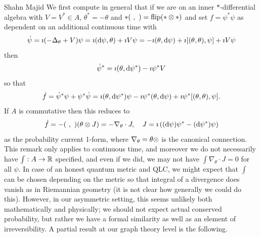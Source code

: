 \begin{artengenv}{Shahn Majid}
We first compute in general that if we are on an inner $*$-differential algebra with $V=V^*\in A$, $\theta^*=-\theta$ and $*(\ ,\ )={\rm flip}(*\otimes *)$ and set $f=\psi^*\psi$ as dependent on an additional continuous time with 
\[ \dot\psi=\imath(-\Delta_\theta+ V)\psi=\imath ({\rm d}\psi,\theta)+\imath V\psi=-\imath(\theta,{\rm d}\psi)+\imath[(\theta,\theta),\psi]+\imath V\psi\]
then
\[ \dot \psi^*=\imath(\theta,{\rm d} \psi^*)-\imath \psi^*V\]
so that 
\[ \dot f=\dot\psi^*\psi+\psi^*\dot\psi=\imath(\theta,{\rm d} \psi^*)\psi-\imath\psi^*(\theta,{\rm d}\psi)+\imath\psi^*[(\theta,\theta),\psi].\]
If $A$ is commutative then this reduces to 
\[ \dot f=-(\ ,\ )(\theta\otimes J)=-\nabla_\theta\cdot J,\quad J=\imath\left(({\rm d}\psi)\psi^*-({\rm d}\psi^*)\psi\right)\]
as the probability current 1-form, where $\nabla_\theta=\theta\otimes$ is the canonical connection. This remark only applies to continuous time, and moreover we do not necessarily have $\int:A\to {\mathbb{R}}$ specified, and even if we did, we may not have $\int \nabla_\theta\cdot J=0$ for all $\psi$. In case of an honest quantum metric and QLC, we might expect that $\int$ can be chosen depending on the metric so that integral of a divergence does vanish as in Riemannian geometry (it is not clear how generally we could do this). However, in our asymmetric setting, this seems unlikely both mathematically and physically; we should not expect actual conserved probability, but rather we have a formal similarity as well as an element of irreversibility. A partial result at our graph theory level is the following.


\end{artengenv}
